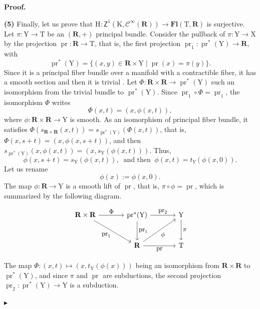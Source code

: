 \documentclass[10pt,letterpaper,reqno]{amsart}
\theoremstyle{article}
\renewenvironment{proof}{\noindent \textbf{Proof.}} {\nolinebreak $\blacktriangleright$}
\newcommand{\1}{{\hat 1}}
\newcommand{\0}{{\hat 0}}
\newcommand{\RR}{\mathbf R}
\newcommand{\sfbZ}{{\boldsymbol{\mathsf Z}}}
\def \H{\mathrm H}
\def \K{\mathrm K}
\def \T{\mathrm T}
\def \X{\mathrm X}
\def \Y{\mathrm Y}
\newcommand{\Cinfty}{\mathcal{C}^\infty}
\DeclareMathOperator{\Fb}{\boldsymbol{\mathsf{Fl}}}
\newcommand{\Ka}{\K}
\newcommand{\pr}{\operatorname{pr}}
\renewcommand{\Fb}{\mathbf{Fl}}
\def \H{\mathrm H}
\begin{document}
\begin{proof}
    
    \textbf{(5)} Finally,
    let us prove that $\H : \sfbZ^1(\Ka,\Cinfty(\RR)) \to \Fb(\T,\RR)$ is surjective.
    Let $\pi : \Y \to \T$ be an $(\RR,+)$ principal bundle.
    Consider the pullback of $\pi : \Y \to \X$ by the projection $\pr : \RR \to \T$,
    that is,
    the first projection $\pr_1: \pr^*(\Y) \to \RR$,
    with
    $$
      \pr^*(\Y) = \{(x,y) \in \RR \times \Y \mid \pr(x) = \pi(y)\}.
      $$
    Since it is a principal fiber bundle over a manifold with a contractible fiber,
    it has a smooth section and then it is trivial \cite{Hus94}.
    Let $\Phi : \RR \times \RR \to \pr^*(\Y)$ such an isomorphism from the trivial bundle to $\pr^*(\Y)$.
    Since $\pr_1 \circ \Phi = \pr_1$,
    the isomorphism $\Phi$ writes
    $$
      \Phi(x,t) = (x,\phi(x,t)),
      $$
    where $\phi: \RR \times \RR \to \Y$ is smooth.
    As an isomorphism of principal fiber bundle,
    it satisfies $\Phi (s_{\RR \times \RR}(x,t)) = s_{\pr^*(\Y)}( \Phi(x,t))$,
    that is,
    $\Phi(x,s + t) = (x, \phi(x,s+t))$,
    and then $s_{\pr^*(\Y)}(x,\phi(x,t)) = (x,s_\Y(\phi(x,t)))$.
    Thus,
    $$
      \phi(x,s+t) = s_\Y(\phi(x,t)),
      \ \text{ and then } \
      \phi(x,t) = t_Y( \phi(x,0)).
      $$
    Let us rename
    $$
      \phi(x) := \phi(x,0).
      $$
    The map $\phi : \RR \to \Y$ is a smooth lift of $\pr$,
    that is,
    $\pi \circ \phi = \pr$,
    which is summarized by the following diagram.
    
    $$
      \begin{tikzcd}[column sep=large, row sep=large, every label/.append style = {font = \small}]
      \RR \times \RR \arrow[dr, swap, "\pr_1"] \arrow[r, "\Phi"] &  \pr^*(\Y) \arrow[d, "\pr_1"] \arrow[r, "\pr_2"]  & \Y \arrow[d,"\pi"] \\
      {} & \RR \arrow[ru, swap, "\phi"] \arrow[r, swap, "\pr"] & \T
      \end{tikzcd}
      $$
    
    The map $\Phi : (x,t) \mapsto (x, t_\Y(\phi(x)))$ being an isomorphism from $\RR \times \RR$ to $\pr^*(\Y)$,
    and since $\pi$ and $\pr$ are subductions,
    the second projection $\pr_2 : \pr^*(\Y) \to \Y$ is a subduction.
    

\end{proof}
\end{document}
